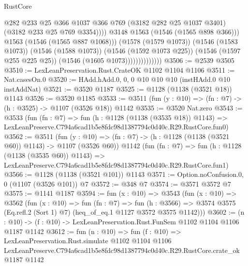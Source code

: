 \begin{lexlean}{RustCore}
\begin{coremodule}
                                      @282
                                      @233
                                      @25
                                      @366
                                      @1037
                                      @366
                                      @769
                                      (@3182 @282 @25 @1037 @3401)
                                      (@3182 @233 @25 @769 @3354))))
                                @3148
                                @1563
                                (@1546 (@1565 @898 @366)))
                              @1563
                              (@1546 (@1565 @887 @1068)))
                            (@1578 (@1579 @1073))
                            (@1546 (@1583 @1073))
                            (@1546 (@1588 @1073))
                            (@1546 (@1592 @1073 @225))
                            (@1546 (@1597 @255 @225 @25))
                            (@1546 (@1605 @1073))))))))))))))
@3506 := @2539 @3505
@3510 := LexLeanPreservation.Rust.CrateOK @1102 @1104 @1106
@3511 := Nat.casesOn.{0}
@3520 := HAdd.hAdd.{0, 0, 0} @10 @10 @10 (instHAdd.{0} @10 instAddNat)
@3521 := @3520 @1187
@3525 := @1128 (@1138 (@3521 @18)) @1143
@3526 := @3520 @1185
@3533 := @3511 (fun (y : @10) => (fn : @7) -> (h : @3525) -> @1107 (@3526 @18)) @1142
@3535 := @3520 Nat.zero
@3543 := @3533
    (fun (fn : @7) =>
    fun (h : @1128 (@1138 (@3535 @18)) @1143) =>
    LexLeanPreserve.C794a6cad1b5e8fdc98d1387794c0d40c.R29.RustCore.fun0)
@3562 := @3511
    (fun (y : @10) => (fn : @7) -> (h : @1128 (@1138 (@3521 @60)) @1143) -> @1107 (@3526 @60))
    @1142
    (fun (fn : @7) =>
    fun (h : @1128 (@1138 (@3535 @60)) @1143) =>
    LexLeanPreserve.C794a6cad1b5e8fdc98d1387794c0d40c.R29.RustCore.fun1)
@3566 := @1128 (@1138 (@3521 @101)) @1143
@3571 := Option.noConfusion.{0, 0} (@1107 (@3526 @101)) @7
@3572 := @348 @7
@3574 := @3571 @3572 @7
@3575 := @1141 @1187
@3594 := fun (x : @10) =>
  @3543
    (fun (x : @10) =>
    @3562
      (fun (x : @10) =>
      fun (fn : @7) =>
      fun (h : @3566) =>
      @3574 @3575 (Eq.refl.{2} (Sort 1) @7) (heq_of_eq.{1} @1127 @3572 @3575 @1142)))
@3602 := (n : @10) -> (f : @10) -> LexLeanPreservation.Rust.FunSem @1102 @1104 @1106 @1187 @1142
@3612 := fun (n : @10) =>
  fun (f : @10) =>
  LexLeanPreservation.Rust.simulate
    @1102
    @1104
    @1106
    LexLeanPreserve.C794a6cad1b5e8fdc98d1387794c0d40c.R29.RustCore.crate_ok
    @1187
    @1142
\end{coremodule}
\end{lexlean}
